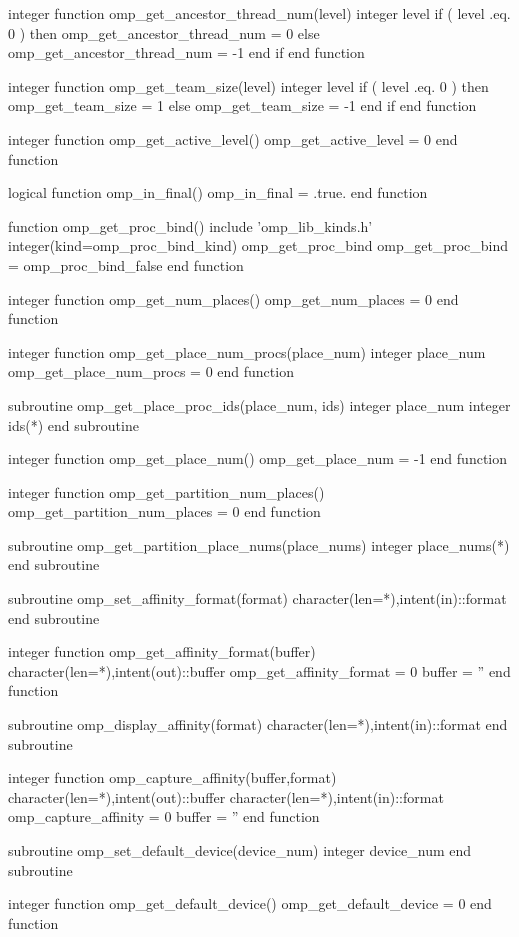 {\begin{ompfFunction}
integer function omp_get_ancestor_thread_num(level)
  integer level
  if ( level .eq. 0 ) then
     omp_get_ancestor_thread_num = 0
  else
     omp_get_ancestor_thread_num = -1
  end if
end function

integer function omp_get_team_size(level)
  integer level
  if ( level .eq. 0 ) then
     omp_get_team_size = 1
  else
     omp_get_team_size = -1
  end if
end function

integer function omp_get_active_level()
  omp_get_active_level = 0
end function

logical function omp_in_final()
  omp_in_final = .true.
end function

function omp_get_proc_bind()
  include 'omp_lib_kinds.h'
  integer(kind=omp_proc_bind_kind) omp_get_proc_bind
  omp_get_proc_bind = omp_proc_bind_false
end function

integer function omp_get_num_places()
  omp_get_num_places = 0
end function

integer function omp_get_place_num_procs(place_num)
  integer place_num
  omp_get_place_num_procs = 0
end function

subroutine omp_get_place_proc_ids(place_num, ids)
  integer place_num
  integer ids(*)
end subroutine

integer function omp_get_place_num()
  omp_get_place_num = -1
end function

integer function omp_get_partition_num_places()
  omp_get_partition_num_places = 0
end function

subroutine omp_get_partition_place_nums(place_nums)
  integer place_nums(*)
end subroutine

subroutine omp_set_affinity_format(format)
  character(len=*),intent(in)::format
end subroutine

integer function omp_get_affinity_format(buffer)
  character(len=*),intent(out)::buffer
  omp_get_affinity_format = 0
  buffer = ''
end function

subroutine omp_display_affinity(format)
  character(len=*),intent(in)::format
end subroutine

integer function omp_capture_affinity(buffer,format)
  character(len=*),intent(out)::buffer
  character(len=*),intent(in)::format
  omp_capture_affinity = 0
  buffer = ''
end function

subroutine omp_set_default_device(device_num)
  integer device_num
end subroutine

integer function omp_get_default_device()
  omp_get_default_device = 0
end function


\end{ompfFunction}}
